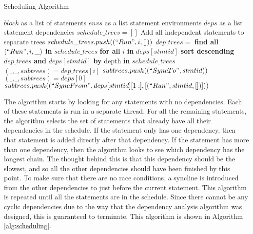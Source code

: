 \begin{algorithm}[H]
\caption{Scheduling Algorithm}
\label{alg:scheduling}
\begin{algorithmic}[1]
    \Require $block$ as a list of statements
    \Require $envs$ as a list statement environments
    \Require $deps$ as a list statement dependencies
    \State $schedule\_trees = []$
     \Comment Add all independent statements to separate trees
            \State $schedule\_trees.push((``Run", i, []))$
        \EndIf
    \EndFor
                \State $dep\_trees =$ \textbf{find all} $(``Run", i, \_)$ \textbf{in} $schedule\_trees$ \textbf{for all} $i$ \textbf{in} $deps[stmtid]$
                \State \textbf{sort descending} $dep\_trees$ \textbf{and} $deps[stmtid]$ \textbf{by} depth \textbf{in} $schedule\_trees$
                    \State $(\_,\_,subtrees) = dep\_trees[i]$
                    \State $subtrees.push((``SyncTo", stmtid))$
                \EndFor
                \State $(\_,\_,subtrees) = deps[0]$
                \State $subtrees.push((``SyncFrom", deps[stmtid][1:], [(``Run", stmtid, [])]))$
            \EndIf
        \EndFor
    \EndWhile
\end{algorithmic}
\end{algorithm}

The algorithm starts by looking for any statements with no dependencies. Each of these statements is run in a separate thread. For all the remaining statements, the algorithm selects the set of statements that already have all their dependencies in the schedule. If the statement only has one dependency, then that statement is added directly after that dependency. If the statement has more than one dependency, then the algorithm looks to see which dependency has the longest chain. The thought behind this is that this dependency should be the slowest, and so all the other dependencies should have been finished by this point. To make sure that there are no race conditions, a syncline is introduced from the other dependencies to just before the current statement. This algorithm is repeated until all the statements are in the schedule. Since there cannot be any cyclic dependencies due to the way that the dependency analysis algorithm was designed, this is guaranteed to terminate. This algorithm is shown in Algorithm \autoref{alg:scheduling}.
